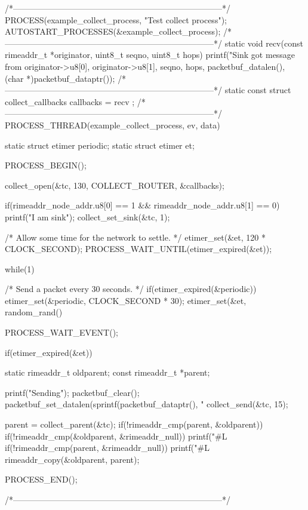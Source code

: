 \begin{DoxyCodeInclude}
/*---------------------------------------------------------------------------*/
PROCESS(example_collect_process, "Test collect process");
AUTOSTART_PROCESSES(&example_collect_process);
/*---------------------------------------------------------------------------*/
static void
recv(const rimeaddr_t *originator, uint8_t seqno, uint8_t hops)
{
  printf("Sink got message from %
         originator->u8[0], originator->u8[1],
         seqno, hops,
         packetbuf_datalen(),
         (char *)packetbuf_dataptr());
}
/*---------------------------------------------------------------------------*/
static const struct collect_callbacks callbacks = { recv };
/*---------------------------------------------------------------------------*/
PROCESS_THREAD(example_collect_process, ev, data)
{
  static struct etimer periodic;
  static struct etimer et;
  
  PROCESS_BEGIN();

  collect_open(&tc, 130, COLLECT_ROUTER, &callbacks);

  if(rimeaddr_node_addr.u8[0] == 1 &&
     rimeaddr_node_addr.u8[1] == 0) {
        printf("I am sink\n");
        collect_set_sink(&tc, 1);
  }

  /* Allow some time for the network to settle. */
  etimer_set(&et, 120 * CLOCK_SECOND);
  PROCESS_WAIT_UNTIL(etimer_expired(&et));

  while(1) {

    /* Send a packet every 30 seconds. */
    if(etimer_expired(&periodic)) {
      etimer_set(&periodic, CLOCK_SECOND * 30);
      etimer_set(&et, random_rand() %
    }

    PROCESS_WAIT_EVENT();


    if(etimer_expired(&et)) {
      static rimeaddr_t oldparent;
      const rimeaddr_t *parent;

      printf("Sending\n");
      packetbuf_clear();
      packetbuf_set_datalen(sprintf(packetbuf_dataptr(),
                                  "%
      collect_send(&tc, 15);

      parent = collect_parent(&tc);
      if(!rimeaddr_cmp(parent, &oldparent)) {
        if(!rimeaddr_cmp(&oldparent, &rimeaddr_null)) {
          printf("#L %
        }
        if(!rimeaddr_cmp(parent, &rimeaddr_null)) {
          printf("#L %
        }
        rimeaddr_copy(&oldparent, parent);
      }
    }

  }

  PROCESS_END();
}
/*---------------------------------------------------------------------------*/
\end{DoxyCodeInclude}
 
